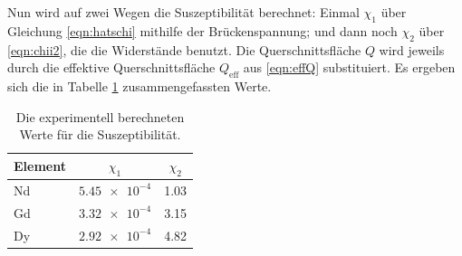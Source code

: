     Nun wird auf zwei Wegen die Suszeptibilität berechnet: Einmal $\chi_1$ über Gleichung \eqref{eqn:hatschi} mithilfe der Brückenspannung; 
    und dann noch $\chi_2$ über \eqref{eqn:chii2}, die die Widerstände benutzt. 
    Die Querschnittsfläche $Q$ wird jeweils durch die effektive Querschnittsfläche $Q_\text{eff}$ aus \eqref{eqn:effQ} substituiert. 
    Es ergeben sich die in Tabelle \ref{tab:chii} zusammengefassten Werte. 
    \begin{table}
        \centering
        \caption{Die experimentell berechneten Werte für die Suszeptibilität.}
        \label{tab:chii}
        \begin{tabular}{l c c}
            \toprule
            Element & $\chi_1$ &  $\chi_2$ \\
            \midrule
            Nd & $\num{5.45e-4}$ & 1.03 \\
            Gd & $\num{3.32e-4}$ & 3.15 \\
            Dy & $\num{2.92e-4}$ & 4.82 \\
            \bottomrule
        \end{tabular}
    \end{table}